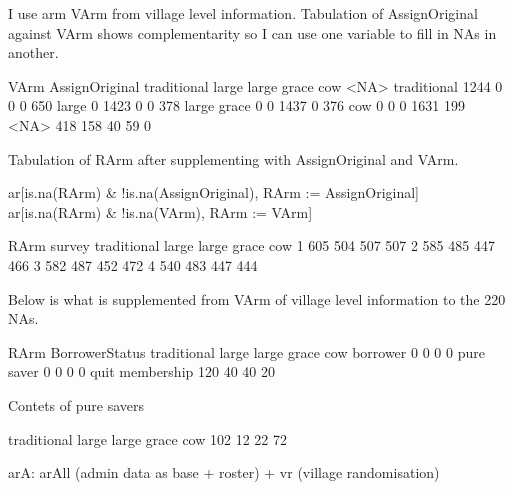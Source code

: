 I use arm \textsf{VArm} from village level information. Tabulation of \textsf{AssignOriginal} against \textsf{VArm} shows complementarity so I can use one variable to fill in NAs in another.
\begin{Schunk}
\begin{Soutput}
              VArm
AssignOriginal traditional large large grace  cow <NA>
   traditional        1244     0           0    0  650
   large                 0  1423           0    0  378
   large grace           0     0        1437    0  376
   cow                   0     0           0 1631  199
   <NA>                418   158          40   59    0
\end{Soutput}
\end{Schunk}
Tabulation of \textsf{RArm} after supplementing with \textsf{AssignOriginal} and \textsf{VArm}.
\begin{Schunk}
\begin{Sinput}
ar[is.na(RArm) & !is.na(AssignOriginal), RArm := AssignOriginal]
ar[is.na(RArm) & !is.na(VArm), RArm := VArm]
\end{Sinput}
\end{Schunk}
\begin{Schunk}
\begin{Soutput}
      RArm
survey traditional large large grace cow
     1         605   504         507 507
     2         585   485         447 466
     3         582   487         452 472
     4         540   483         447 444
\end{Soutput}
\end{Schunk}
Below is what is supplemented from \textsf{VArm} of village level information to the 220 NAs.
\begin{Schunk}
\begin{Soutput}
                 RArm
BorrowerStatus    traditional large large grace cow
  borrower                  0     0           0   0
  pure saver                0     0           0   0
  quit membership         120    40          40  20
\end{Soutput}
\end{Schunk}
Contets of \textsf{pure savers}
\begin{Schunk}
\begin{Soutput}

traditional       large large grace         cow 
        102          12          22          72 
\end{Soutput}
\end{Schunk}
\textsf{arA}: \textsf{arAll} (admin data as base + roster) + \textsf{vr} (village randomisation)
